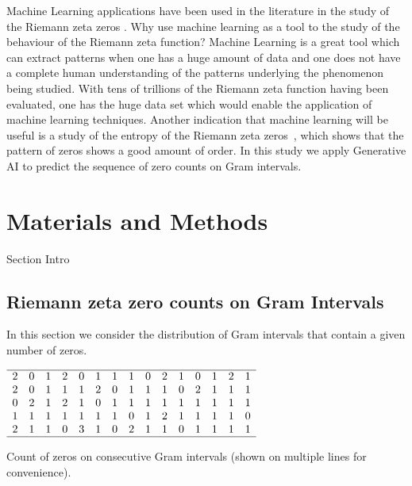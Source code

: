 \documentclass[twoside]{article}
\begin{document}
 Machine Learning applications have been used in the literature in the study of the Riemann zeta zeros \cite{osneural,Shanker 2018a,osentropy}.
Why use machine learning  as a tool to the study of the behaviour of the Riemann zeta function?  Machine Learning is a great tool which can extract patterns when one has a huge amount of data and one does not have a complete human understanding of the patterns underlying the phenomenon being studied. With tens of trillions of the Riemann zeta function having been evaluated, one has the huge data set which would enable the application of machine learning techniques. Another indication that machine learning will be useful is a study of the entropy of the Riemann zeta zeros~\cite{osentropy}, which shows that the pattern of zeros shows a good amount of order. In this study we apply Generative AI to predict the sequence of zero counts on Gram intervals.


\section{\label{sec2}Materials and Methods}
Section Intro

\subsection{\label{seckaratsuba}Riemann zeta zero counts on Gram Intervals}

In this section we consider the distribution of Gram intervals that contain a given number of zeros. 
\begin{table}
\centering \(\begin{array}{ccccccccccccccc}
\hline
2& 0& 1& 2& 0& 1& 1& 1& 0& 2& 1& 0& 1& 2& 1 \\
2& 0& 1& 1& 1& 2& 0& 1& 1& 1& 0& 2& 1& 1& 1 \\
0& 2& 1& 2& 1& 0& 1& 1& 1& 1& 1& 1& 1& 1& 1 \\
1& 1& 1& 1& 1& 1& 1& 0& 1& 2& 1& 1& 1& 1& 0 \\
2& 1& 1& 0& 3& 1& 0& 2& 1& 1& 0& 1& 1& 1& 1 \\
\hline
\end{array}\)
\caption{Count of zeros on consecutive Gram intervals (shown on multiple lines for convenience).} 
\label{tab:sequence}
\end{table}
\end{document}
